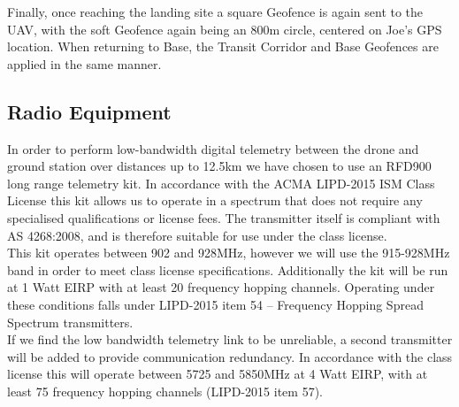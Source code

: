Finally, once reaching the landing site a square Geofence is again sent to the UAV, with the soft Geofence again being an 800m circle, centered on Joe's GPS location. When returning to Base, the Transit Corridor and Base Geofences are applied in the same manner.

\subsection{Radio Equipment}
In order to perform low-bandwidth digital telemetry between the drone and ground station over distances up to 12.5km we have chosen to use an RFD900 long range telemetry kit. In accordance with the ACMA LIPD-2015 ISM Class License this kit allows us to operate in a spectrum that does not require any specialised qualifications or license fees. The transmitter itself is compliant with AS 4268:2008, and is therefore suitable for use under the class license.\\

This kit operates between 902 and 928MHz, however we will use the 915-928MHz band in order to meet class license specifications.  Additionally the kit will be run at 1 Watt EIRP with at least 20 frequency hopping channels. Operating under these conditions falls under LIPD-2015 item 54 – Frequency Hopping Spread Spectrum transmitters.\\

If we find the low bandwidth telemetry link to be unreliable, a second transmitter will be added to provide communication redundancy. In accordance with the class license this will operate between 5725 and 5850MHz at 4 Watt EIRP, with at least 75 frequency hopping channels (LIPD-2015 item 57).